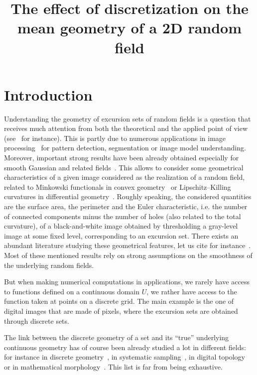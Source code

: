 \documentclass[AHL,Unicode,longabstracts,published]{cedram}
\title[The effect of discretization]{The effect of discretization on the mean geometry of a 2D random field}
\author[\initial{H.} \lastname{Biermé}]{\firstname{Hermine} \lastname{Biermé}}
\author[\initial{A.} \lastname{Desolneux}]{\firstname{Agnès} \lastname{Desolneux}}
\begin{document}
\maketitle

\section{Introduction}

Understanding the geometry of excursion sets of random fields is a question that receives much attention from both the theoretical and the applied point of view (see~\cite{AdlerReview00} for instance). This is partly due to numerous applications in image processing~\cite{SerraBook,Worsley96} for pattern detection, segmentation or image model understanding. Moreover, important strong results have been already obtained especially for smooth Gaussian and related fields~\cite{AdlerTaylorBook}. This allows to consider some geometrical characteristics of a given image considered as the realization of a random field, related to Minkowski functionals in convex geometry~\cite{Stoyan87} or Lipschitz--Killing curvatures in differential geometry~\cite{Thale08}. Roughly speaking, the considered quantities are the surface area, the perimeter and the Euler characteristic, i.e. the number of connected components minus the number of holes (also related to the total curvature), of a black-and-white image obtained by thresholding a gray-level image at some fixed level, corresponding to an excursion set. There exists an abundant literature studying these geometrical features, let us cite for instance~\cite{Azais,DEL17,EstradeLeon, KV17,LachiezeRey2018II}. Most of these mentioned results rely on strong assumptions on the smoothness of the underlying random fields.

But when making numerical computations in applications, we rarely have access to functions defined on a continuous domain $U$, we rather have access to the function taken at points on a discrete grid. The main example is the one of digital images that are made of pixels, where the excursion sets are obtained through discrete sets.

The link between the discrete geometry of a set and its ``true'' underlying continuous geometry has of course been already studied a lot in different fields: for instance in discrete geometry~\cite{Klenk06,Svane2014,Svane2015}, in systematic sampling~\cite{GundersenJensen87}, in digital topology~\cite{Gray71,Pratt07} or in mathematical morphology~\cite{MatheronBook, SerraBook}. This list is far from being exhaustive.
\end{document}
